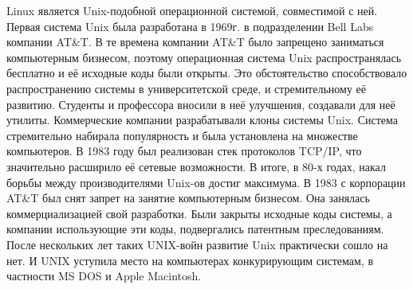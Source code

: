 \documentclass[bachelor, och, referat, times]{SCWorks}
\begin{document}
\par Linux является Unix-подобной операционной 
системой, совместимой с 
ней. Первая система Unix была разработана в 1969г. 
в подразделении Bell 
Labs компании AT\&T. В те времена компании AT\&T 
было запрещено заниматься
компьютерным бизнесом, поэтому операционная система 
Unix распространялась 
бесплатно и её исходные коды были открыты. Это 
обстоятельство 
способствовало распространению системы в 
университетской среде, и 
стремительному её развитию. Студенты и профессора 
вносили в неё улучшения,
создавали для неё утилиты. Коммерческие компании 
разрабатывали клоны 
системы Unix. Система стремительно набирала 
популярность и была 
установлена на множестве компьютеров. В 1983 году 
был реализован стек 
протоколов TCP/IP, что значительно расширило её 
сетевые возможности. В 
итоге, в 80-х годах, накал борьбы между 
производителями Unix-ов достиг 
максимума. В 1983 с корпорации AT\&T был снят 
запрет на занятие 
компьютерным бизнесом. Она занялась 
коммерциализацией свой разработки. 
Были закрыты исходные коды системы, а компании 
использующие эти коды, 
подвергались патентным преследованиям. После 
нескольких лет таких 
UNIX-войн развитие Unix практически сошло на нет. И 
UNIX уступила место на
компьютерах конкурирующим системам, в частности MS 
DOS и Apple Macintosh.
\end{document}
